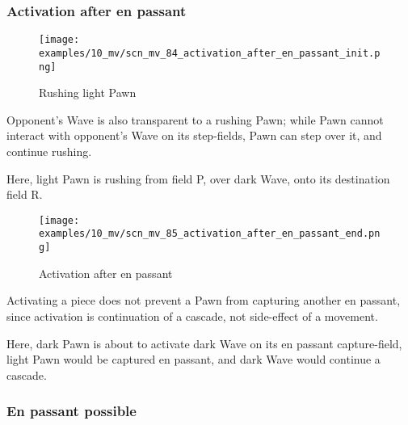 \clearpage %

\subsubsection*{Activation after en passant}
\label{sec:Miranda's veil/Wave/En passant/Activation after en passant}

\vspace*{-0.7\baselineskip}
\noindent
\begin{wrapfigure}[8]{l}{0.4\textwidth}
\centering
\texttt{[image: examples/10\_mv/scn\_mv\_84\_activation\_after\_en\_passant\_init.png]}
\vspace*{-1.4\baselineskip}
\caption{Rushing light Pawn}
\label{fig:scn_mv_84_activation_after_en_passant_init}
\end{wrapfigure}
Opponent's Wave is also transparent to a rushing Pawn; while Pawn cannot interact
with opponent's Wave on its step-fields, Pawn can step over it, and continue
rushing.

Here, light Pawn is rushing from field P, over dark Wave, onto its destination
field R.

\vspace*{2.7\baselineskip}
\noindent
\begin{wrapfigure}[10]{l}{0.4\textwidth}
\centering
\texttt{[image: examples/10\_mv/scn\_mv\_85\_activation\_after\_en\_passant\_end.png]}
\vspace*{-1.4\baselineskip}
\caption{Activation after en passant}
\label{fig:scn_mv_85_activation_after_en_passant_end}
\end{wrapfigure}
Activating a piece does not prevent a Pawn from capturing another en passant, since
activation is continuation of a cascade, not side-effect of a movement.

Here, dark Pawn is about to activate dark Wave on its en passant capture-field,
light Pawn would be captured en passant, and dark Wave would continue a cascade.

\clearpage %

\subsubsection*{En passant possible}
\label{sec:Miranda's veil/Wave/En passant/En passant possible}

